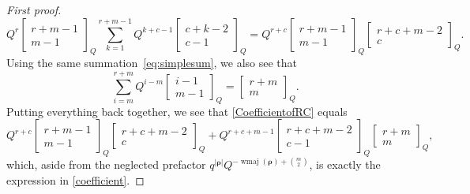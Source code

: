 \documentclass[12pt,reqno]{amsart}
\numberwithin{equation}{section}
\theoremstyle{definition}
\DeclareMathOperator{\wmaj}{wmaj}
\newcommand{\rem}{{\boldsymbol\rho}}
\begin{document}
\begin{proof}[First proof]
$$
    Q^r\begin{bmatrix} r+m-1 \\ m-1 \end{bmatrix}_Q\sum_{k=1}^{r+m-1}Q^{k+c-1}\begin{bmatrix} c+k-2 \\ c-1 \end{bmatrix}_Q
    =Q^{r+c}\begin{bmatrix} r+m-1 \\ m-1 \end{bmatrix}_Q\begin{bmatrix} r+c+m-2 \\ c\end{bmatrix}_Q.
$$
Using the same summation~\eqref{eq:simplesum}, we also
see that
\[
\sum_{i=m}^{r+m}Q^{i-m}\begin{bmatrix} i-1 \\ m-1 \end{bmatrix}_Q = \begin{bmatrix} r+m \\ m \end{bmatrix}_Q.
\]
Putting everything back together, we see that \eqref{CoefficientofRC} equals
\begin{equation*}
 Q^{r+c}\begin{bmatrix} r+m-1 \\ m-1 \end{bmatrix}_Q\begin{bmatrix} r+c+m-2 \\ c\end{bmatrix}_Q
    +Q^{r+c+m-1}\begin{bmatrix} r+c+m-2 \\ c-1 \end{bmatrix}_Q \begin{bmatrix} r+m \\ m \end{bmatrix}_Q,
\end{equation*}
which, aside from the neglected prefactor $q^{|\rem|}
Q^{-\wmaj(\rem)+\binom{m}{2}}$, is exactly the expression in
\cref{coefficient}. 
\end{proof}
\end{document}
